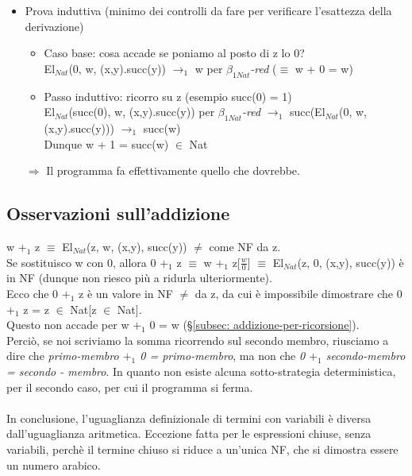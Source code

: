 \noindent
\normalsize
\begin{itemize}
\item Prova induttiva (minimo dei controlli da fare per verificare l'esattezza della derivazione)
\begin{itemize}
\item Caso base: cosa accade se poniamo al posto di z lo 0?\\
El$_{Nat}$(0, w, (x,y).succ(y)) $\rightarrow_1$ w per \textit{$\beta_{1Nat}$-red} ($\equiv$ w + 0 = w)
\item Passo induttivo: ricorro su z (esempio succ(0) = 1)\\
El$_{Nat}$(succ(0), w, (x,y).succ(y)) per \textit{$\beta_{1Nat}$-red} $\rightarrow_1$ succ(El$_{Nat}$(0, w, (x,y).succ(y))) $\rightarrow_1$ succ(w) \\
Dunque w + 1 = succ(w) $\in$ Nat
\end{itemize}
\noindent
$\Rightarrow$ Il programma fa effettivamente quello che dovrebbe.
\end{itemize}

\subsection{Osservazioni sull'addizione}
\label{subsubsec: osservazioni-addizione}
w $+_1$ z $\equiv$ El$_{Nat}$(z, w, (x,y), succ(y)) $\neq$ come NF da z.\\
Se sostituisco w con 0, allora 0 $+_1$ z $\equiv$ w $+_1$ z[$\frac{w}{0}$] $\equiv$ El$_{Nat}$(z, 0, (x,y), succ(y)) \`e in NF (dunque non riesco pi\`u a ridurla ulteriormente). 
\\Ecco che 0 $+_1$ z \`e un valore in NF $\neq$ da z, da cui \`e impossibile dimostrare che 0 $+_1$ z = z $\in$ Nat[z $\in$ Nat].\\
Questo non accade per w $+_1$ 0 = w (\S \ref{subsec: addizione-per-ricorsione}).\\ 
Perci\`o, se noi scriviamo la somma ricorrendo sul secondo membro, riusciamo a dire che \textit{primo-membro $+_1$ 0 = primo-membro}, ma non che \textit{0 $+_1$ secondo-membro = secondo - membro}. In quanto non esiste alcuna sotto-strategia deterministica, per il secondo caso, per cui il programma si ferma.
\\\\
In conclusione, l'uguaglianza definizionale di termini con variabili \`e diversa dall'uguaglianza aritmetica. Eccezione fatta per le espressioni chiuse, senza variabili, perch\`e il termine chiuso si riduce a un'unica NF, che si dimostra essere un numero arabico.

